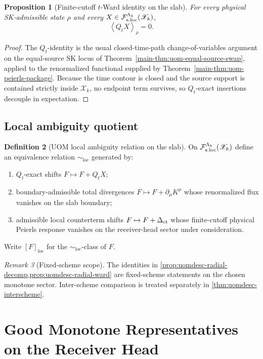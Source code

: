 \documentclass[11pt]{article}
\theoremstyle{definition}
\newtheorem{definition}{Definition}[section]
\theoremstyle{plain}
\newtheorem{proposition}[definition]{Proposition}
\theoremstyle{remark}
\newtheorem{remark}[definition]{Remark}
\newcommand{\Fsloc}{\mathcal F_{\rm s.loc}}
\newcommand{\Xscr}{\mathscr X}
\newcommand{\Qt}{Q_t}
\newcommand{\loc}{\mathrm{loc}}
\newcommand{\pair}[1]{\left\langle #1 \right\rangle}
\begin{document}
\begin{proposition}[Finite-cutoff \(t\)-Ward identity on the slab]
\label{prop:uomdesc-ward}
For every physical SK-admissible state \(\rho\) and every
\(X\in\Fsloc^{\Lambda_k}(\Xscr_k)\),
\[
\pair{\Qt X}_{\rho}=0.
\]
\end{proposition}

\begin{proof}
The \(\Qt\)-identity is the usual closed-time-path change-of-variables argument on the equal-source
SK locus of Theorem~\ref{main-thm:uom-equal-source-swap}, applied to the renormalized functional
supplied by Theorem~\ref{main-thm:uom-peierls-package}.
Because the time contour is closed and the source support is contained strictly inside \(\Xscr_k\),
no endpoint term survives, so \(\Qt\)-exact insertions decouple in expectation.
\end{proof}

\subsection{Local ambiguity quotient}

\begin{definition}[UOM local ambiguity relation on the slab]
\label{def:uomdesc-loc-quot}
On \(\Fsloc^{\Lambda_k}(\Xscr_k)\) define an equivalence relation \(\sim_{\loc}\) generated by:
\begin{enumerate}[leftmargin=2em]
\item \(\Qt\)-exact shifts \(F\mapsto F+\Qt X\);
\item boundary-admissible total divergences \(F\mapsto F+\partial_\mu K^\mu\) whose renormalized
  flux vanishes on the slab boundary;
\item admissible local counterterm shifts \(F\mapsto F+\Delta_{\rm ct}\) whose finite-cutoff
  physical Peierls response vanishes on the receiver-head sector under consideration.
\end{enumerate}
Write \([F]_{\loc}\) for the \(\sim_{\loc}\)-class of \(F\).
\end{definition}

\begin{remark}[Fixed-scheme scope]
\label{rem:uomdesc-fixed-scheme}
The identities in \cref{prop:uomdesc-radial-decomp,prop:uomdesc-radial-ward} are fixed-scheme
statements on the chosen monotone sector.
Inter-scheme comparison is treated separately in \cref{thm:uomdesc-interscheme}.
\end{remark}

\section{Good Monotone Representatives on the Receiver Head}
\label{sec:uomdesc-monotone}
\end{document}
